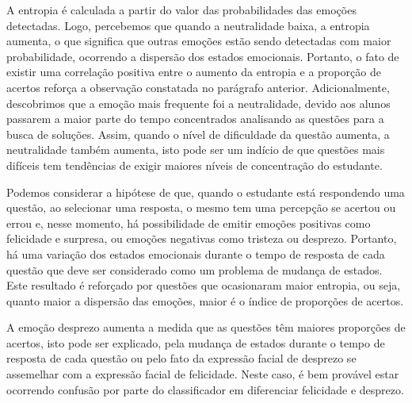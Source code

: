 A entropia é calculada a partir do valor das probabilidades das emoções detectadas. Logo, percebemos que quando a neutralidade baixa, a entropia aumenta, o que significa que outras emoções estão sendo detectadas com maior probabilidade, ocorrendo a dispersão dos estados emocionais. Portanto, o fato de existir uma correlação positiva entre o aumento da entropia e a proporção de acertos reforça a observação constatada no parágrafo anterior. Adicionalmente, descobrimos que a emoção mais frequente foi a neutralidade, devido aos alunos passarem a maior parte do tempo concentrados analisando as questões para a busca de soluções. Assim, quando o nível de dificuldade da questão aumenta, a neutralidade também aumenta, isto pode ser um indício de que questões mais difíceis tem tendências de exigir maiores níveis de concentração do estudante.

Podemos considerar a hipótese de que, quando o estudante está respondendo uma questão, ao selecionar uma resposta, o mesmo tem uma percepção se acertou ou errou e, nesse momento, há possibilidade de emitir emoções positivas como felicidade e surpresa, ou emoções negativas como tristeza ou desprezo. Portanto, há uma variação dos estados emocionais durante o tempo de resposta de cada questão que deve ser considerado como um problema de mudança de estados. Este resultado é reforçado por
questões que ocasionaram maior entropia, ou seja, quanto maior a dispersão das emoções, maior é o índice de proporções de acertos.

A emoção desprezo aumenta a medida que as questões têm maiores proporções de acertos, isto pode ser explicado, pela mudança de estados durante o tempo de resposta de cada questão ou pelo fato da expressão facial de desprezo se assemelhar com a expressão facial de felicidade. Neste caso, é bem provável estar ocorrendo confusão por parte do classificador em diferenciar felicidade e desprezo.

